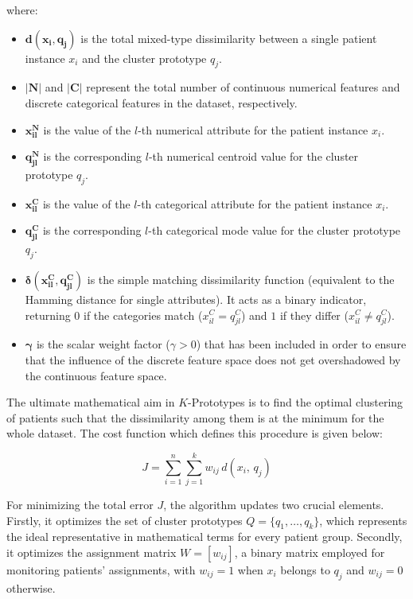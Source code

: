 where:
\begin{itemize}
    \item $\boldsymbol{d(x_i, q_j)}$ is the total mixed-type dissimilarity between a single patient instance $x_i$ and the cluster prototype $q_j$.
    \item $\boldsymbol{|N|}$ and $\boldsymbol{|C|}$ represent the total number of continuous numerical features and discrete categorical features in the dataset, respectively.
    \item $\boldsymbol{x_{il}^N}$ is the value of the $l$-th numerical attribute for the patient instance $x_i$.
    \item $\boldsymbol{q_{jl}^N}$ is the corresponding $l$-th numerical centroid value for the cluster prototype $q_j$.
    \item $\boldsymbol{x_{il}^C}$ is the value of the $l$-th categorical attribute for the patient instance $x_i$.
    \item $\boldsymbol{q_{jl}^C}$ is the corresponding $l$-th categorical mode value for the cluster prototype $q_j$.
    \item $\boldsymbol{\delta(x_{il}^C, q_{jl}^C)}$ is the simple matching dissimilarity function (equivalent to the Hamming distance for single attributes). It acts as a binary indicator, returning $0$ if the categories match ($x_{il}^C = q_{jl}^C$) and $1$ if they differ ($x_{il}^C \neq q_{jl}^C$).
    \item $\boldsymbol{\gamma}$ is the scalar weight factor ($\gamma > 0$) that has been included in order to ensure that the influence of the discrete feature space does not get overshadowed by the continuous feature space.
\end{itemize}

\clearpage

The ultimate mathematical aim in $K$-Prototypes is to find the optimal clustering of patients such that the dissimilarity among them is at the minimum for the whole dataset. The cost function which defines this procedure is given below:

\begin{equation}
    J = \sum_{i=1}^{n} \sum_{j=1}^{k} w_{ij}\, d(x_i,\, q_j)
    \label{eq:kproto_obj}
\end{equation}

For minimizing the total error $J$, the algorithm updates two crucial elements. Firstly, it optimizes the set of cluster prototypes $Q = \{q_1, \ldots, q_k\}$, which represents the ideal representative in mathematical terms for every patient group. Secondly, it optimizes the assignment matrix $W = [w_{ij}]$, a binary matrix employed for monitoring patients' assignments, with $w_{ij}=1$ when $x_i$ belongs to $q_j$ and $w_{ij}=0$ otherwise.

